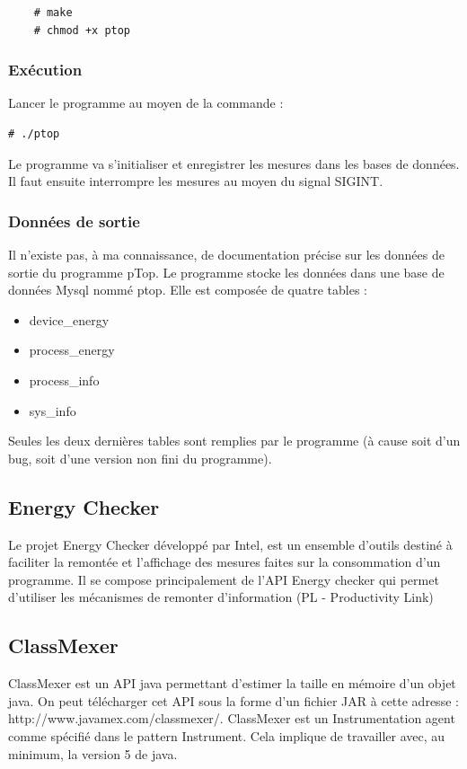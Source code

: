 \documentclass[a4paper, 11pt]{report}
\begin{document}
\begin{verbatim}
	# make
	# chmod +x ptop
\end{verbatim}

\subsubsection{Exécution}
Lancer le programme au moyen de la commande :

\begin{verbatim}
# ./ptop
\end{verbatim}

Le programme va s'initialiser et enregistrer les mesures dans les bases de données. Il faut ensuite interrompre les mesures au moyen du signal SIGINT.

\subsubsection{Données de sortie}
Il n’existe pas, à ma connaissance, de documentation précise sur les données de sortie du programme pTop.  Le programme stocke les données dans une base de données Mysql nommé ptop. Elle est composée de quatre tables :
\begin{itemize}
	\item device\_energy
	\item process\_energy
	\item process\_info
	\item sys\_info
\end{itemize}

Seules les deux dernières tables sont remplies par le programme (à cause soit d’un bug, soit d’une version non fini du programme).

\subsection{Energy Checker}
Le projet Energy Checker développé par Intel, est un ensemble d’outils destiné à faciliter la remontée et l’affichage des mesures faites sur la consommation d’un programme. Il se compose principalement de l’API Energy checker qui permet d’utiliser les mécanismes de remonter d’information (PL - Productivity Link)

\subsection{ClassMexer}
ClassMexer est un API java permettant d’estimer la taille en mémoire d’un objet java. On peut télécharger cet API sous la forme d’un fichier JAR à cette adresse : http://www.javamex.com/classmexer/. ClassMexer est un Instrumentation agent comme spécifié dans le pattern Instrument. Cela implique de travailler avec, au minimum, la version 5 de java.
\end{document}
